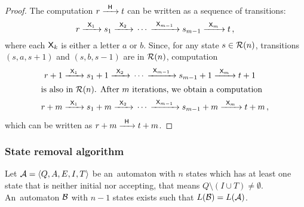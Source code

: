 \begin{proof}
    The computation $r {\; \xrightarrow[]{\: \; {\mathsf{H}} \: \;} \;} t$ can be written as a sequence of transitions:
    \[
        r {\; \xrightarrow[]{\: \; {\mathsf{X}}_1 \: \;} \;} s_1 {\; \xrightarrow[]{\: \; {\mathsf{X}}_2 \: \;} \;} \dotsb {\; \xrightarrow[]{\: \; {\mathsf{X}}_{m-1} \: \;} \;} s_{m-1} {\; \xrightarrow[]{\: \; {\mathsf{X}}_m \: \;} \;} t \, ,
    \]
    where each ${\mathsf{X}}_k$ is either a letter $a$ or $b$. Since, for any state $s \in {\mathcal{R}}(n)$, transitions $(s, a, s+1)$ and $(s, b, s-1)$ are in ${\mathcal{R}}(n)$, computation
    \begin{align*}
       r + 1 &{\; \xrightarrow[]{\: \; {\mathsf{X}}_1 \: \;} \;} s_1 + 1 {\; \xrightarrow[]{\: \; {\mathsf{X}}_2 \: \;} \;} \dotsb {\; \xrightarrow[]{\: \; {\mathsf{X}}_{m-1} \: \;} \;} s_{m-1} + 1 {\; \xrightarrow[]{\: \; {\mathsf{X}}_m \: \;} \;} t + 1 \\
    \intertext{is also in ${\mathcal{R}}(n)$. After $m$ iterations, we obtain a computation}
       r + m &{\; \xrightarrow[]{\: \; {\mathsf{X}}_1 \: \;} \;} s_1 + m {\; \xrightarrow[]{\: \; {\mathsf{X}}_2 \: \;} \;} \dotsb {\; \xrightarrow[]{\: \; {\mathsf{X}}_{m-1} \: \;} \;} s_{m-1} + m {\; \xrightarrow[]{\: \; {\mathsf{X}}_m \: \;} \;} t + m \, ,
    \end{align*}
    which can be written as $r+m {\; \xrightarrow[]{\: \; {\mathsf{H}} \: \;} \;} t+m$.
\end{proof}

\subsubsection*{State removal algorithm}

\begin{lemma}\label{lm:state_removal_lemma}
    Let ${\mathcal{A}} = \langle Q, A, E, I, T \rangle$ be an~automaton with $n$ states which has at least one state that is neither initial nor accepting, that means $Q \setminus (I \cup T) \neq \emptyset$. An~automaton ${\mathcal{B}}$ with $n - 1$ states exists such that $L({\mathcal{B}}) = L({\mathcal{A}})$.
\end{lemma}

